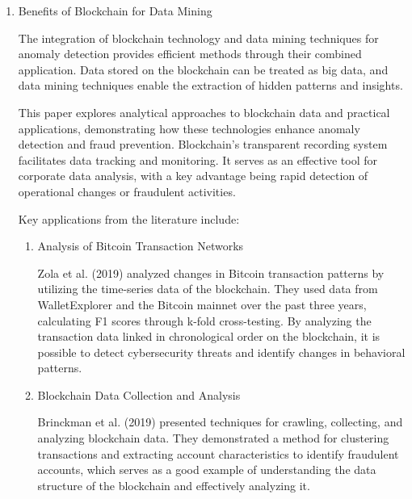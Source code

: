 \documentclass[conference]{IEEEtran}
\begin{document}
\begin{enumerate}[itemsep=2ex, parsep=1ex]
	\item Benefits of Blockchain for Data Mining
	      	      	      
	      The integration of blockchain technology and data mining techniques for anomaly detection provides efficient methods through their combined application. Data stored on the blockchain can be treated as big data, and data mining techniques enable the extraction of hidden patterns and insights.
	      	      	      
	      This paper explores analytical approaches to blockchain data and practical applications, demonstrating how these technologies enhance anomaly detection and fraud prevention. Blockchain's transparent recording system facilitates data tracking and monitoring. It serves as an effective tool for corporate data analysis, with a key advantage being rapid detection of operational changes or fraudulent activities.
	      	      	      
	      Key applications from the literature include:
	      	      	      
	      \begin{enumerate}[itemsep=2ex, parsep=1ex]
	      	\item Analysis of Bitcoin Transaction Networks
	      	      	      	      	      	      
	      	      Zola et al. (2019) analyzed changes in Bitcoin transaction patterns by utilizing the time-series data of the blockchain. They used data from WalletExplorer and the Bitcoin mainnet over the past three years, calculating F1 scores through k-fold cross-testing. By analyzing the transaction data linked in chronological order on the blockchain, it is possible to detect cybersecurity threats and identify changes in behavioral patterns.
	      	      	      	      	      	      
	      	\item Blockchain Data Collection and Analysis
	      	      	      	      	      	      
	      	      Brinckman et al. (2019) presented techniques for crawling, collecting, and analyzing blockchain data. They demonstrated a method for clustering transactions and extracting account characteristics to identify fraudulent accounts, which serves as a good example of understanding the data structure of the blockchain and effectively analyzing it.
	      	      	      	      	      	      

\end{enumerate}
\end{enumerate}
\end{document}
